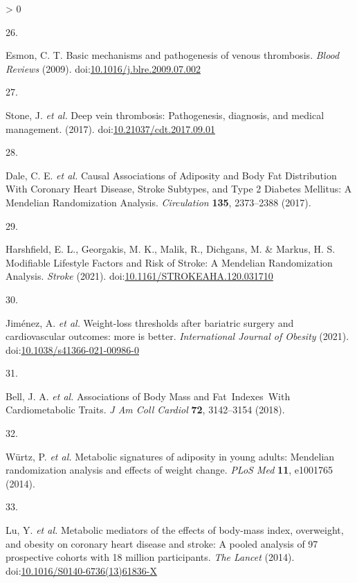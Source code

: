 \documentclass[11pt,twoside]{bristolthesis}
\newlength{\cslhangindent}
\newlength{\csllabelwidth}
\newenvironment{CSLReferences}[2] %
 {%
  \setlength{\parindent}{0pt}
  \ifodd #1 \everypar{\setlength{\hangindent}{\cslhangindent}}\ignorespaces\fi
  \ifnum #2 > 0
  \setlength{\parskip}{#2\baselineskip}
  \fi
 }%
 {}
\newcommand{\CSLLeftMargin}[1]{\parbox[t]{\csllabelwidth}{#1}}
\newcommand{\CSLRightInline}[1]{\parbox[t]{\linewidth - \csllabelwidth}{#1}\break}
\begin{document}
\begin{CSLReferences}{0}{0}
\leavevmode\hypertarget{ref-Esmon2009}{}%
\CSLLeftMargin{26. }
\CSLRightInline{Esmon, C. T. {Basic mechanisms and pathogenesis of venous thrombosis}. \emph{Blood Reviews} (2009). doi:\href{https://doi.org/10.1016/j.blre.2009.07.002}{10.1016/j.blre.2009.07.002}}

\leavevmode\hypertarget{ref-Stone2017}{}%
\CSLLeftMargin{27. }
\CSLRightInline{Stone, J. \emph{et al.} {Deep vein thrombosis: Pathogenesis, diagnosis, and medical management}. (2017). doi:\href{https://doi.org/10.21037/cdt.2017.09.01}{10.21037/cdt.2017.09.01}}

\leavevmode\hypertarget{ref-Dale2017}{}%
\CSLLeftMargin{28. }
\CSLRightInline{Dale, C. E. \emph{et al.} {Causal Associations of Adiposity and Body Fat Distribution With Coronary Heart Disease, Stroke Subtypes, and Type 2 Diabetes Mellitus: A Mendelian Randomization Analysis}. \emph{Circulation} \textbf{135}, 2373--2388 (2017).}

\leavevmode\hypertarget{ref-Harshfield2021}{}%
\CSLLeftMargin{29. }
\CSLRightInline{Harshfield, E. L., Georgakis, M. K., Malik, R., Dichgans, M. \& Markus, H. S. {Modifiable Lifestyle Factors and Risk of Stroke: A Mendelian Randomization Analysis}. \emph{Stroke} (2021). doi:\href{https://doi.org/10.1161/STROKEAHA.120.031710}{10.1161/STROKEAHA.120.031710}}

\leavevmode\hypertarget{ref-Jimenez2021}{}%
\CSLLeftMargin{30. }
\CSLRightInline{Jiménez, A. \emph{et al.} {Weight-loss thresholds after bariatric surgery and cardiovascular outcomes: more is better}. \emph{International Journal of Obesity} (2021). doi:\href{https://doi.org/10.1038/s41366-021-00986-0}{10.1038/s41366-021-00986-0}}

\leavevmode\hypertarget{ref-Bell2018a}{}%
\CSLLeftMargin{31. }
\CSLRightInline{Bell, J. A. \emph{et al.} {Associations of Body Mass and Fat~Indexes~With Cardiometabolic Traits}. \emph{J Am Coll Cardiol} \textbf{72}, 3142--3154 (2018).}

\leavevmode\hypertarget{ref-Wurtz2014}{}%
\CSLLeftMargin{32. }
\CSLRightInline{Würtz, P. \emph{et al.} {Metabolic signatures of adiposity in young adults: Mendelian randomization analysis and effects of weight change}. \emph{PLoS Med} \textbf{11}, e1001765 (2014).}

\leavevmode\hypertarget{ref-Lu2014}{}%
\CSLLeftMargin{33. }
\CSLRightInline{Lu, Y. \emph{et al.} {Metabolic mediators of the effects of body-mass index, overweight, and obesity on coronary heart disease and stroke: A pooled analysis of 97 prospective cohorts with 1{{}}8 million participants}. \emph{The Lancet} (2014). doi:\href{https://doi.org/10.1016/S0140-6736(13)61836-X}{10.1016/S0140-6736(13)61836-X}}


\end{CSLReferences}
\end{document}
